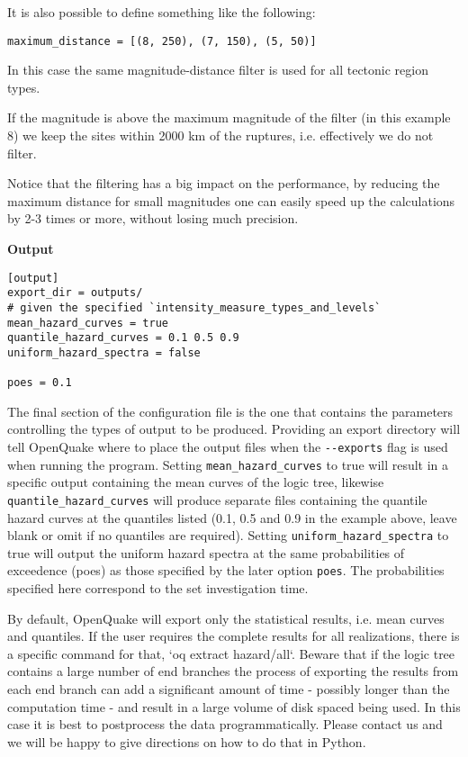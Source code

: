 It is also possible to define something like the following:

\begin{verbatim}
maximum_distance = [(8, 250), (7, 150), (5, 50)]
\end{verbatim}

In this case the same magnitude-distance filter is used for all tectonic
region types.

If the magnitude is above the maximum magnitude of the filter
(in this example 8) we keep the sites within 2000 km of the ruptures, i.e.
effectively we do not filter.

Notice that the filtering has a big impact on the performance, by
reducing the maximum distance for small magnitudes one can easily
speed up the calculations by 2-3 times or more, without losing much
precision.

\textbf{Output}

\begin{verbatim}
[output]
export_dir = outputs/
# given the specified `intensity_measure_types_and_levels`
mean_hazard_curves = true
quantile_hazard_curves = 0.1 0.5 0.9
uniform_hazard_spectra = false

poes = 0.1
\end{verbatim}

The final section of the configuration file is the one that contains the
parameters controlling the types of output to be produced. Providing an export
directory will tell OpenQuake where to place the output files when the
\texttt{-{}-exports} flag is used when running the program. Setting
\verb=mean_hazard_curves= to true will result in a specific output containing
the mean curves of the logic tree, likewise \verb=quantile_hazard_curves= will
produce separate files containing the quantile hazard curves at the quantiles
listed (0.1, 0.5 and 0.9 in the example above, leave blank or omit if no
quantiles are required). Setting \verb=uniform_hazard_spectra= to true will
output the uniform hazard spectra at the same probabilities of exceedence
(poes) as those specified by the later option \verb=poes=. The probabilities
specified here correspond to the set investigation time.

By default, OpenQuake will export only the statistical results, i.e. mean
curves and quantiles. If the user requires the complete results for all
realizations, there is a specific command for that, `oq extract hazard/all`.
Beware that if the logic tree contains a large number of end branches the
process of exporting the results from each end branch can add a significant
amount of time - possibly longer than the computation time - and result in a
large volume of disk spaced being used. In this case it is best to postprocess
the data programmatically. Please contact us and we will be happy to give
directions on how to do that in Python.
